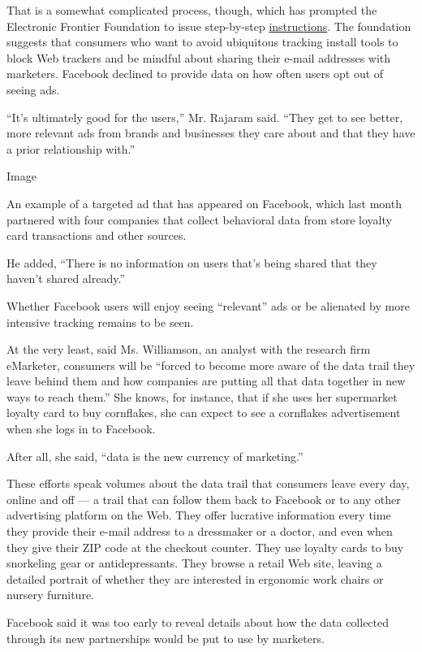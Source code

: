 That is a somewhat complicated process, though, which has prompted the
Electronic Frontier Foundation to issue step-by-step
\href{https://www.eff.org/deeplinks/2013/02/howto-opt-out-databrokers-showing-your-targeted-advertisements-facebook}{instructions}.
The foundation suggests that consumers who want to avoid ubiquitous
tracking install tools to block Web trackers and be mindful about
sharing their e-mail addresses with marketers. Facebook declined to
provide data on how often users opt out of seeing ads.

``It's ultimately good for the users,'' Mr. Rajaram said. ``They get to
see better, more relevant ads from brands and businesses they care about
and that they have a prior relationship with.''

Image

An example of a targeted ad that has appeared on Facebook, which last
month partnered with four companies that collect behavioral data from
store loyalty card transactions and other sources.

He added, ``There is no information on users that's being shared that
they haven't shared already.''

Whether Facebook users will enjoy seeing ``relevant'' ads or be
alienated by more intensive tracking remains to be seen.

At the very least, said Ms. Williamson, an analyst with the research
firm eMarketer, consumers will be ``forced to become more aware of the
data trail they leave behind them and how companies are putting all that
data together in new ways to reach them.'' She knows, for instance, that
if she uses her supermarket loyalty card to buy cornflakes, she can
expect to see a cornflakes advertisement when she logs in to Facebook.

After all, she said, ``data is the new currency of marketing.''

These efforts speak volumes about the data trail that consumers leave
every day, online and off --- a trail that can follow them back to
Facebook or to any other advertising platform on the Web. They offer
lucrative information every time they provide their e-mail address to a
dressmaker or a doctor, and even when they give their ZIP code at the
checkout counter. They use loyalty cards to buy snorkeling gear or
antidepressants. They browse a retail Web site, leaving a detailed
portrait of whether they are interested in ergonomic work chairs or
nursery furniture.

Facebook said it was too early to reveal details about how the data
collected through its new partnerships would be put to use by marketers.

